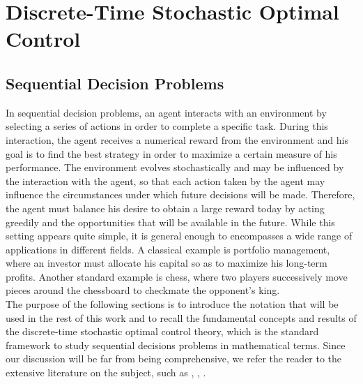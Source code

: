 \chapter{Discrete-Time Stochastic Optimal Control}

\section{Sequential Decision Problems}
In sequential decision problems, an agent interacts with an environment by
selecting a series of actions in order to complete a specific task. During this
interaction, the agent receives a numerical reward from the environment and his
goal is to find the best strategy in order to maximize a certain measure of his
performance. The environment evolves stochastically and may be influenced by
the interaction with the agent, so that each action taken by the agent may 
influence the circumstances under which future decisions will be made. 
Therefore, the agent must balance his desire to obtain a large reward today 
by acting greedily and the opportunities that will be available in the future. 
While this setting appears quite simple, it is general enough to encompasses a 
wide range of applications in different fields. A classical example is 
portfolio management, where an investor must allocate his capital so as to 
maximize his long-term profits. Another standard example is chess, where two
players successively move pieces around the chessboard to checkmate the
opponent's king.\\
The purpose of the following sections is to introduce the notation that will be
used in the rest of this work and to recall the fundamental concepts and 
results of the discrete-time stochastic optimal control theory, which is the 
standard framework to study sequential decisions problems in mathematical
terms. Since our discussion will be far from being comprehensive, we refer the
reader to the extensive literature on the subject, such as
\cite{bertsekas1978stochastic}, \cite{puterman1994markov}, 
\cite{bertsekas1995dynamic}.

